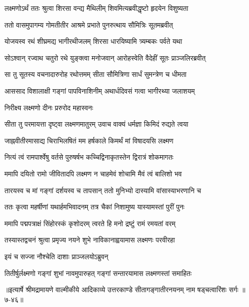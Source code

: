 \twolineshloka
{लक्ष्मणोऽर्थं ततः श्रुत्वा शिरसा वन्द्य मैथिलीम्}
{शिवमित्यब्रवीद्धृष्टो हृदयेन विशुष्यता} %

\twolineshloka
{ततो वासमुपागम्य गोमतीतीर आश्रमे}
{प्रभाते पुनरुत्थाय सौमित्रिः सूतमब्रवीत्} %

\twolineshloka
{योजयस्व रथं शीघ्रमद्य भागीरथीजलम्}
{शिरसा धारयिष्यामि त्र्यम्बकः पर्वते यथा} %

\twolineshloka
{सोऽश्वान् रज्वाथ चतुरो रथे युङ्क्त्वा मनोजवान्}
{आरोहस्वेति वैदेहीं सूतः प्राञ्जलिरब्रवीत्} %

\twolineshloka
{सा तु सूतस्य वचनादारुरोह रथोत्तमम्}
{सीता सौमित्रिणा सार्धं सुमन्त्रेण च धीमता} %

\twolineshloka
{आससाद विशालाक्षी गङ्गां पापविनाशिनीम्}
{अथार्धदिवसं गत्वा भागीरथ्या जलाशयम्} %

\onelineshloka
{निरीक्ष्य लक्ष्मणो दीनः प्ररुरोद महास्वनः} %

\twolineshloka
{सीता तु परमायत्ता दृष्ट्वा लक्ष्मणमातुरम्}
{उवाच वाक्यं धर्मज्ञा किमिदं रुद्यते त्वया} %

\twolineshloka
{जाह्नवीतीरमासाद्य चिराभिलषितं मम}
{हर्षकाले किमर्थं मां विषादयसि लक्ष्मण} %

\twolineshloka
{नित्यं त्वं रामपार्श्वेषु वर्तसे पुरुषर्षभ}
{कच्चिद्विनाकृतस्तेन द्विरात्रं शोकमागतः} %

\twolineshloka
{ममापि दयितो रामो जीवितादपि लक्ष्मण}
{न चाहमेवं शोचामि मैवं त्वं बालिशो भव} %

\twolineshloka
{तारयस्व च मां गङ्गां दर्शयस्व च तापसान्}
{ततो मुनिभ्यो दास्यामि वांसास्याभरणानि च} %

\twolineshloka
{ततः कृत्वा महर्षीणां यथार्हमभिवादनम्}
{तत्र चैकां निशामुष्य यास्यामस्तां पुरीं पुनः} %

\twolineshloka
{ममापि पद्मपत्राक्षं सिंहोरस्कं कृशोदरम्}
{त्वरते हि मनो द्रष्टुं रामं रमयतां वरम्} %

\twolineshloka
{तस्यास्तद्वचनं श्रुत्वा प्रमृज्य नयने शुभे}
{नाविकानाह्वयामास लक्ष्मणः परवीरहा} %

\onelineshloka
{इयं च सज्जा नौश्चेति दाशाः प्राञ्जलयोऽब्रुवन्} %

\twolineshloka
{तितीर्षुर्लक्ष्मणो गङ्गां शुभां नावमुपारुहत्}
{गङ्गां सन्तारयामास लक्ष्मणस्तां समाहितः} %


॥इत्यार्षे श्रीमद्रामायणे वाल्मीकीये आदिकाव्ये उत्तरकाण्डे सीतागङ्गातीरनयनम् नाम षड्चत्वारिंशः सर्गः ॥७-४६॥
